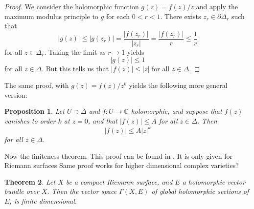 \documentclass[12pt]{article}
\theoremstyle{plain}
\newtheorem{thm}{Theorem}[section]
\newtheorem{prop}[thm]{Proposition}
\theoremstyle{definition}
\numberwithin{equation}{section}
\newcommand{\ov}[1]{\overline#1}
\newcommand{\D}{\Delta}
\newcommand{\C}{\mathbb{C}}
\begin{document}
\begin{proof}
We consider the holomorphic function $g(z) = f(z) / z$ and apply the maximum modulus principle to $g$ for each $0 < r < 1$. There exists $z_r \in \partial \D_r$ such that
\[
|g(z)| \leq |g(z_r)| = \frac{|f(z_r)|}{|z_r|} = \frac{|f(z_r)|}{r} \leq \frac{1}{r}
\]
for all $z \in \D_r$. Taking the limit as $r \rightarrow 1$ yields
\[
|g(z)| \leq 1
\]
for all $z \in \D$. But this tells us that $|f(z)| \leq |z|$ for all $z \in \D$.
\end{proof}
The same proof, with $g(z) = f(z) / z^k$ yields the following more general version:
\begin{prop}
Let $U \supset \ov\D$ and $f : U \rightarrow \C$ holomorphic, and suppose that $f(z)$ vanishes to order $k$ at $z=0$, and that $|f(z)| \leq A$ for all $z \in \D$. Then
\[
|f(z)| \leq A |z|^k
\]
for all $z \in \D$.
\end{prop}

Now the finiteness theorem. This proof can be found in {\cite[p. 32]{Narasimhan}}. It is only given for Riemann surfaces {\color{red}Same proof works for higher dimensional complex varieties?}
\begin{thm}
Let $X$ be a compact Riemann surface, and $E$ a holomorphic vector bundle over $X$. Then the vector space $\Gamma(X, E)$ of global holomorphic sections of $E$, is finite dimensional.
\end{thm}
\end{document}
